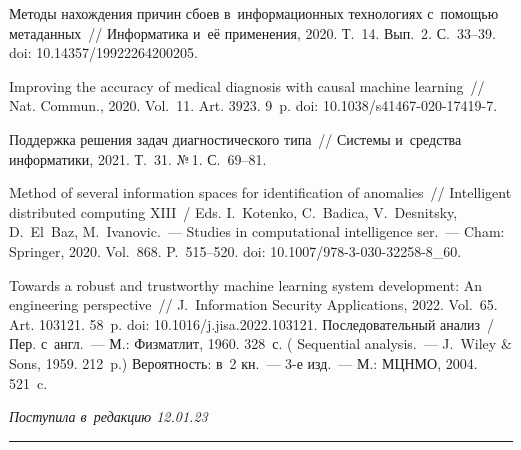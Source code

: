 \begin{multicols}{2}
{{\begin{thebibliography}{99}
 Методы нахождения 
причин сбоев в~информационных технологиях с~помощью метаданных~// Информатика и~её 
применения, 2020. Т.~14. Вып.~2. С.~33--39. doi: 10.14357/19922264200205.

 Improving the accuracy of medical diagnosis with causal 
machine learning~// Nat. Commun., 2020. Vol.~11. Art. 3923. 9~p.  
doi: 10.1038/s41467-020-17419-7.

 Поддержка решения задач 
диагностического типа~// Системы и~средства информатики, 2021. Т.~31. №\,1. С.~69--81. 

 Method of several information spaces for identification of 
anomalies~// Intelligent distributed computing XIII~/ 
Eds. I.~Kotenko, 
C.~Badica, V.~Desnitsky, D.~El~Baz, M.~Ivanovic.~---
Studies in  computational intelligence ser.~--- Cham: Springer, 2020. Vol.~868. P.~515--520. doi: 10.1007/978-3-030-32258-8\_60. 


 Towards a robust 
and trustworthy machine learning system development: An engineering perspective~// J.~Information 
Security Applications, 2022. Vol.~65. Art. 103121. 58~p. doi: 10.1016/j.jisa.2022.103121.
 Последовательный анализ~/ Пер. с~англ.~--- М.: Физматлит, 1960. 328~с. 
( {Sequential analysis}.~--- J.~Wiley \& Sons, 1959. 212~p.)
 Вероятность: в~2 кн.~--- 3-е изд.~--- М.: МЦНМО, 2004. 521~c.

  \end{thebibliography}

 }
 }

\end{multicols}

\vspace*{-6pt}

\hfill{\small\textit{Поступила в~редакцию 12.01.23}}

\vspace*{8pt}




\hrule

